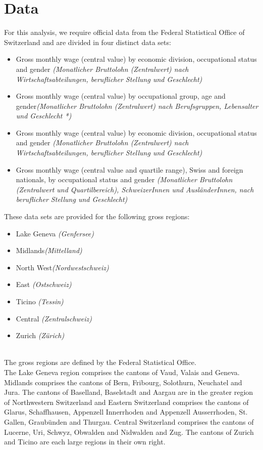 \documentclass{article}
\begin{document}
\section{Data}

For this analysis, we require official data from the Federal Statistical Office of Switzerland and are divided in four distinct data sets: 

    \begin{itemize}
        \item  Gross monthly wage (central value) by economic division, occupational status and gender \textit{(Monatlicher Bruttolohn (Zentralwert) nach Wirtschaftsabteilungen, beruflicher Stellung und Geschlecht)}
        \item  Gross monthly wage (central value) by occupational group, age and gender\textit{(Monatlicher Bruttolohn (Zentralwert) nach Berufsgruppen, Lebensalter und Geschlecht *)}
        \item  Gross monthly wage (central value) by economic division, occupational status and gender \textit{(Monatlicher Bruttolohn (Zentralwert) nach Wirtschaftsabteilungen, beruflicher Stellung und Geschlecht)}
        \item  Gross monthly wage (central value and quartile range), Swiss and foreign nationals, by occupational status and gender \textit{(Monatlicher Bruttolohn (Zentralwert und Quartilbereich), SchweizerInnen und AusländerInnen, nach beruflicher Stellung und Geschlecht)}
    \end{itemize}


These data sets are provided for the following gross regions:
     \begin{itemize}
        \item Lake Geneva \textit{(Genfersee)}
        \item Midlands\textit{(Mittelland)}
        \item North West\textit{(Nordwestschweiz)}
        \item East \textit{(Ostschweiz)}
        \item Ticino \textit{(Tessin)}
        \item Central \textit{(Zentralschweiz)}
        \item Zurich \textit{(Zürich)}
    \end{itemize}
\\

The gross regions are defined by the Federal Statistical Office. \\
The Lake Geneva region comprises the cantons of Vaud, Valais and Geneva. Midlands comprises the cantons of Bern, Fribourg, Solothurn, Neuchatel and Jura. The cantons of Baselland, Baselstadt and Aargau are in the greater region of Northwestern Switzerland and Eastern Switzerland comprises the cantons of Glarus, Schaffhausen, Appenzell Innerrhoden and Appenzell Ausserrhoden, St. Gallen, Graubünden and Thurgau. Central Switzerland comprises the cantons of Lucerne, Uri, Schwyz, Obwalden and Nidwalden and Zug. The cantons of Zurich and Ticino are each large regions in their own right.
\end{document}
